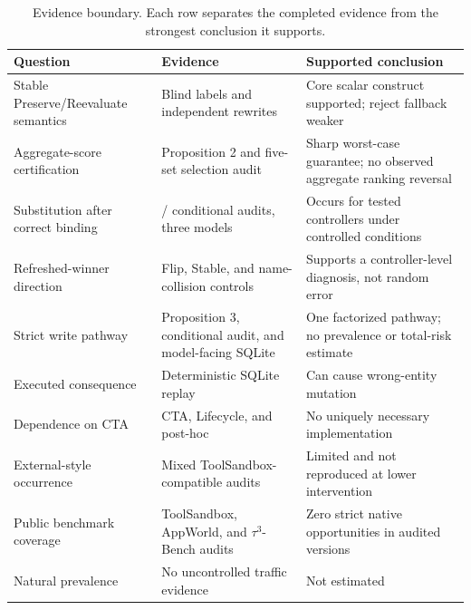 \documentclass[10pt]{article}
\begin{document}
\begin{table}[H]
\centering
\small
\begin{tabular}{p{}p{}p{}}
\toprule
Question & Evidence & Supported conclusion \\
\midrule
Stable Preserve/Reevaluate semantics & Blind labels and independent rewrites & Core scalar construct supported; reject fallback weaker \\
Aggregate-score certification & Proposition 2 and five-set selection audit & Sharp worst-case guarantee; no observed aggregate ranking reversal \\
Substitution after correct binding & \PrimaryDiagnostic{}/\NewSchemaReplication{} conditional audits, three models & Occurs for tested controllers under controlled conditions \\
Refreshed-winner direction & Flip, Stable, and name-collision controls & Supports a controller-level diagnosis, not random error \\
Strict write pathway & Proposition 3, conditional audit, and model-facing SQLite & One factorized pathway; no prevalence or total-risk estimate \\
Executed consequence & Deterministic SQLite replay & Can cause wrong-entity mutation \\
Dependence on CTA & CTA, Lifecycle, and post-hoc \RuleStar{} & No uniquely necessary implementation \\
External-style occurrence & Mixed ToolSandbox-compatible audits & Limited and not reproduced at lower intervention \\
Public benchmark coverage & ToolSandbox, AppWorld, and $\tau^3$-Bench audits & Zero strict native opportunities in audited versions \\
Natural prevalence & No uncontrolled traffic evidence & Not estimated \\
\bottomrule
\end{tabular}
\caption{Evidence boundary. Each row separates the completed evidence from the strongest
conclusion it supports.}
\label{tab:supp-evidence-boundary}
\end{table}

\FloatBarrier
\end{document}
